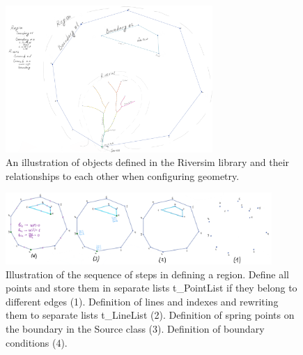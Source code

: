 \documentclass[]{pracamgr}
\begin{document}
      \begin{figure}[H]
        \centering
        \includegraphics[width=0.7\textwidth]{figs/GeometryClasses.png}
        \caption{An illustration of objects defined in the Riversim library and their relationships to each other when configuring geometry.}
        \label{GeometryClasses}
      \end{figure}

      \begin{figure}[H]
        \centering
        \includegraphics[width=0.9\textwidth]{figs/region_workflow.png}
        \caption{Illustration of the sequence of steps in defining a region. Define all points and store them in separate lists t\_PointList if they belong to different edges (1). Definition of lines and indexes and rewriting them to separate lists t\_LineList (2). Definition of spring points on the boundary in the Source class (3). Definition of boundary conditions (4).}
        \label{region_workflow}
      \end{figure}
\end{document}
